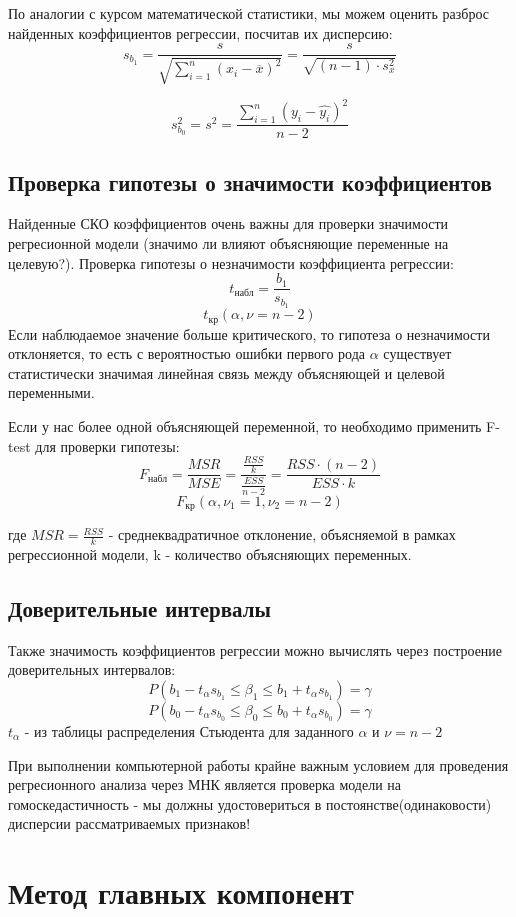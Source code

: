 \documentclass[a4paper,12pt]{article} %
\begin{document}
По аналогии с курсом математической статистики, мы можем оценить разброс найденных коэффициентов регрессии, посчитав их дисперсию:
\[s_{b_1}=\frac{s}{\sqrt{\sum\limits_{i=1}^n (x_i-\overline{x})^2}} = \frac{s}{\sqrt{(n-1)\cdot s_x^2}}\]

\[s_{b_0}^2=s^2=\frac{\sum\limits_{i=1}^n (y_i-\hat{y_i})^2}{n-2}\]

\subsection{Проверка гипотезы о значимости коэффициентов}
Найденные СКО коэффициентов очень важны для проверки значимости регресионной модели (значимо ли влияют объясняющие переменные на целевую?). Проверка гипотезы о незначимости коэффициента регрессии:
\[t_{\text{набл}}=\frac{b_1}{s_{b_1}}\]
\[t_{\text{кр}}(\alpha, \nu=n-2)\]
Если наблюдаемое значение больше критического, то гипотеза о незначимости отклоняется, то есть с вероятностью ошибки первого рода $\alpha$ существует статистически значимая линейная связь между объясняющей и целевой переменными.

Если у нас более одной объясняющей переменной, то необходимо применить F-test для проверки гипотезы:
\[F_{\text{набл}}=\frac{MSR}{MSE}=\frac{\frac{RSS}{k}}{\frac{ESS}{n-2}}=\frac{RSS \cdot (n-2)}{ESS \cdot k}\]
\[F_{\text{кр}}(\alpha, \nu_1=1, \nu_2=n-2)\]

где $MSR=\frac{RSS}{k}$ - среднеквадратичное отклонение, объясняемой в рамках регрессионной модели, k - количество объясняющих переменных.

\subsection{Доверительные интервалы}

Также значимость коэффициентов регрессии можно вычислять через построение доверительных интервалов:
\[P(b_1-t_{\alpha}s_{b_1}\le \beta_1 \le b_1+t_{\alpha}s_{b_1})=\gamma\]
\[P(b_0-t_{\alpha}s_{b_0}\le \beta_0 \le b_0+t_{\alpha}s_{b_0})=\gamma\]
$t_{\alpha}$ - из таблицы распределения Стьюдента для заданного $\alpha$ и $\nu=n-2$

При выполнении компьютерной работы крайне важным условием для проведения регресионного анализа через МНК является проверка модели на гомоскедастичность - мы должны удостовериться в постоянстве(одинаковости) дисперсии рассматриваемых признаков!

\section{Метод главных компонент}
\end{document}
